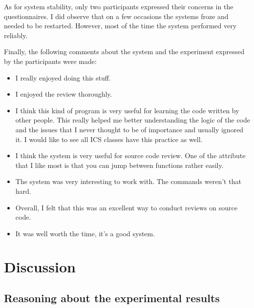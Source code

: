 As for system stability, only two participants expressed their
concerns in the questionnaires. 
I did observe that on a few occasions the systems 
froze and needed to be restarted. However, most of the time the
system performed very reliably.

Finally, the following comments about the system and the experiment
expressed by the participants were made:
\begin{itemize}
\item I really enjoyed doing this stuff.
\item I enjoyed the review thoroughly.
\item I think this kind of program is very useful for learning the
code written by other people. This really helped me better
understanding the logic of the code and the issues that 
I never thought to be of importance and usually ignored it. I would
like to see all ICS classes have this practice as well.
\item I think the system is very useful for source code review. One of
the attribute that I like most is that you can jump between functions
rather easily.
\item The system was very interesting to work with. The commands
weren't that hard.
\item Overall, I felt that this was an excellent way to conduct
reviews on source code.
\item It was well worth the time, it's a good system.
\end{itemize}

\section{Discussion}
\label{sec:discussion}

\subsection{Reasoning about the experimental results}


